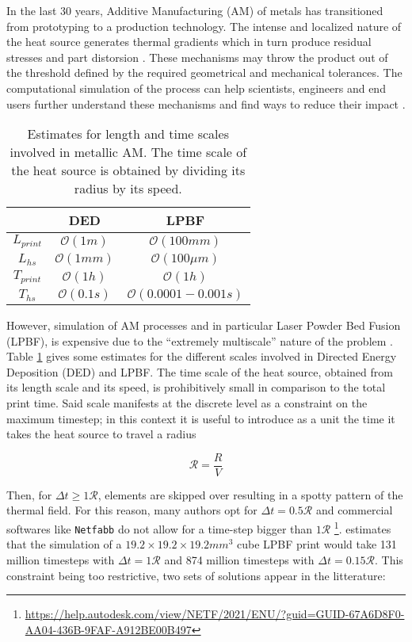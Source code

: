 In the last 30 years, Additive Manufacturing (AM) of metals has transitioned from
prototyping to a production technology. The intense and localized nature of the
heat source generates thermal gradients which in turn produce residual stresses
and part distorsion \citep{Fu2014}.
These mechanisms may throw the product out of the threshold defined by
the required geometrical and mechanical tolerances.
The computational simulation of the process can help
scientists, engineers and end users further understand these mechanisms
and find ways to reduce their impact \citep{Lu2022}.\par

\begin{table}[h]
  \centering
  \begin{tabular}{|c|c|c|}
    \hline
    & DED & LPBF \\
    \hline
    $L_{print}$ & $\mathcal{O}(1 m   )$ &  $\mathcal{O}(100 mm    )$  \\
    $L_{hs}$    & $\mathcal{O}(1 mm  )$ &  $\mathcal{O}(100 \mu m)$  \\
    $T_{print}$ & $\mathcal{O}(1 h   )$ &  $\mathcal{O}(1 h       )$  \\
    $T_{hs}$    & $\mathcal{O}(0.1 s )$ &  $\mathcal{O}(0.0001-0.001 s  )$  \\
    \hline
  \end{tabular}
  \caption{Estimates for length and time scales involved in metallic AM. The time
  scale of the heat source is obtained by dividing its radius by its
  speed.}
  \label{tbl:scales}
\end{table}

However, simulation of AM processes and in particular Laser Powder Bed Fusion (LPBF), is
expensive due to the ``extremely multiscale'' nature
of the problem \citep{Hodge2021}.
Table \ref{tbl:scales}
gives some estimates for the different scales involved in Directed Energy Deposition (DED) and LPBF.
The time scale of the heat source, obtained from its length scale and its speed,
is prohibitively small in comparison to the total print time.
Said scale manifests at the discrete level
as a constraint on the maximum timestep; in this context
it is useful to introduce as a unit
the time it takes the heat source to travel a radius

\begin{equation}\label{eq:trad}
\mathcal{R} = \frac{R}{V}
\end{equation}

Then, for $\Delta t \geq 1 \mathcal{R}$, elements are skipped over resulting
in a spotty pattern of the thermal field.
For this reason, many authors opt for
$\Delta t = 0.5\mathcal{R}$ \citep{Patil2021, Michaleris2014, Stender2018}
and commercial softwares like \texttt{Netfabb}
do not allow for a time-step bigger than $1 \mathcal{R}$
\footnote{\url{https://help.autodesk.com/view/NETF/2021/ENU/?guid=GUID-67A6D8F0-AA04-436B-9FAF-A912BE00B497}}.
\citep{Hodge2021} estimates that the simulation of a
$19.2 \times 19.2 \times 19.2 mm^3$ cube LPBF print would take 
131 million timesteps with $\Delta t = 1 \mathcal{R}$ and
874 million timesteps with $\Delta t = 0.15 \mathcal{R}$.
This constraint being too restrictive, two sets of solutions
appear in the litterature:


